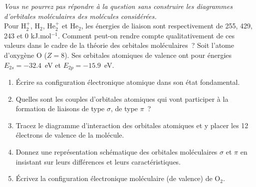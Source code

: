 %
\textsl{Vous ne pourrez pas répondre à la question sans construire les diagrammes d'orbitales moléculaires des molécules
considérées.}\\
Pour H$_2^+$, H$_2$, He$_2^+$ et He$_2$, les \'energies de liaison sont respectivement de 255, 429, 243 et 0 kJ.mol$^{-1}$. 
Comment peut-on rendre compte qualitativement de ces valeurs dans le cadre de la th\'eorie des orbitales mol\'eculaires~?
Soit l'atome d'oxyg\`ene O ($Z=8$). Ses orbitales atomiques de valence ont pour \'energies $E_{2s}=-32.4$~eV et $E_{2p}=-15.9$~eV.
\begin{enumerate}[\bf 1)]
\item \'Ecrire sa configuration \'electronique atomique dans son \'etat fondamental.
\item Quelles sont les couples d'orbitales atomiques qui vont participer \`a la formation de liaisons de type $\sigma$, de type $\pi$~?
\item Tracez le diagramme d'interaction des orbitales atomiques et y placer les 12 \'electrons de valence de la mol\'ecule. 
\item Donnez une repr\'esentation sch\'ematique des orbitales mol\'eculaires $\sigma$ et $\pi$ en insistant sur leurs diff\'erences et leurs caract\'eristiques. 
\item \'Ecrivez la configuration \'electronique mol\'eculaire (de valence) de O$_2$. 
\end{enumerate}
